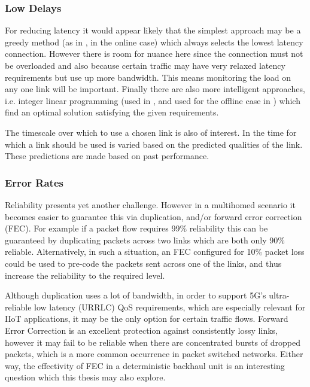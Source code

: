 \subsubsection{Low Delays}

For reducing latency it would appear likely that the simplest approach may be a greedy method (as in \cite{goldenberg2004optimizing}, in the online case) which always selects the lowest latency connection. However there is room for nuance here since the connection must not be overloaded and also because certain traffic may have very relaxed latency requirements but use up more bandwidth. This means monitoring the load on any one link will be important. Finally there are also more intelligent approaches, i.e. integer linear programming (used in \cite{huang2008multiconstrained}, and used for the offline case in \cite{goldenberg2004optimizing}) which find an optimal solution satisfying the given requirements.

The timescale over which to use a chosen link is also of interest. In \cite{habib2007improving} the time for which a link should be used is varied based on the predicted qualities of the link. These predictions are made based on past performance.

\subsubsection{Error Rates}

Reliability presents yet another challenge. However in a multihomed scenario it becomes easier to guarantee this via duplication, and/or forward error correction (FEC). For example if a packet flow requires 99\% reliability this can be guaranteed by duplicating packets across two links which are both only 90\% reliable. Alternatively, in such a situation, an FEC configured for 10\% packet loss could be used to pre-code the packets sent across one of the links, and thus increase the reliability to the required level.

Although duplication uses a lot of bandwidth, in order to support 5G's ultra-reliable low latency (URRLC) QoS requirements, which are especially relevant for IIoT applications, it may be the only option for certain traffic flows. Forward Error Correction is an excellent protection against consistently lossy links, however it may fail to be reliable when there are concentrated bursts of dropped packets, which is a more common occurrence in packet switched networks. Either way, the effectivity of FEC in a deterministic backhaul unit is an interesting question which this thesis may also explore.


